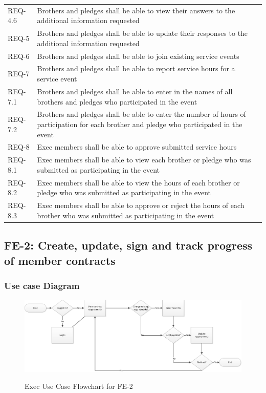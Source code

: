 \documentclass{article}
\newcommand{\req}[1]{REQ-{#1}}
\begin{document}
\begin{tabular}{lp{8cm}}
\req{4.6} & Brothers and pledges shall be able to view their answers
to the additional information requested\\
\req{5} & Brothers and pledges shall be able to update their responses
to the additional information requested\\
\req{6} & Brothers and pledges shall be able to join existing service
events \\
\req{7} & Brothers and pledges shall be able to report service hours
for a service event \\
\req{7.1} & Brothers and pledges shall be able to enter in the names
of all brothers and pledges who participated in the event\\
\req{7.2} & Brothers and pledges shall be able to enter the number of
hours of participation for
each brother and pledge who participated in the event\\
\req{8} & Exec members shall be able to approve submitted service
hours\\
\req{8.1} & Exec members shall be able to view each brother or pledge who was
submitted as participating in the event\\
\req{8.2} & Exec members shall be able to view the hours of each brother
or pledge
who was  submitted as participating in the event\\
\req{8.3} & Exec members shall be able to approve or reject the hours
of each brother who was submitted as participating in the event\\
\end{tabular}

\subsection{FE-2: Create, update, sign and track progress of member
  contracts}

\subsubsection{Use case Diagram}

\newpage

\FloatBarrier
\begin{figure}
\centering
\caption{Exec Use Case Flowchart for FE-2}
\includegraphics[scale=.75]{img/execUseCaseFE2.png}
\label{fig:execUseCaseFE2}
\end{figure}
\FloatBarrier
\end{document}
